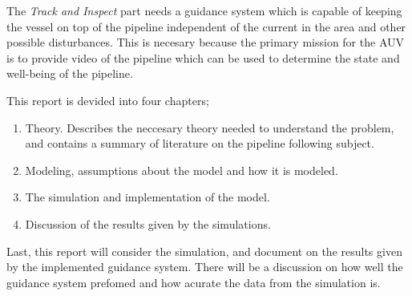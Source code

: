 	The \textit{Track and Inspect} part needs a guidance system which is capable of keeping the vessel 
	on top of the pipeline independent of the current in the area and other possible disturbances. This is
	necesary because the primary mission for the AUV is to provide video of the pipeline which can be used
	to determine the state and well-being of the pipeline.
	
	This report is devided into four chapters;
	\begin{enumerate}
	 \item Theory. Describes the neccesary theory needed to understand the problem, and contains a summary
	of literature on the pipeline following subject.
	 \item Modeling, assumptions about the model and how it is modeled.
	 \item The simulation and implementation of the model.
	 \item Discussion of the results given by the simulations.
	\end{enumerate}

	Last, this report will consider the simulation, and document on the results given by the implemented 
	guidance system. There will be a discussion on how well the guidance system prefomed and how acurate
	the data from the simulation is. 
	
	
	

